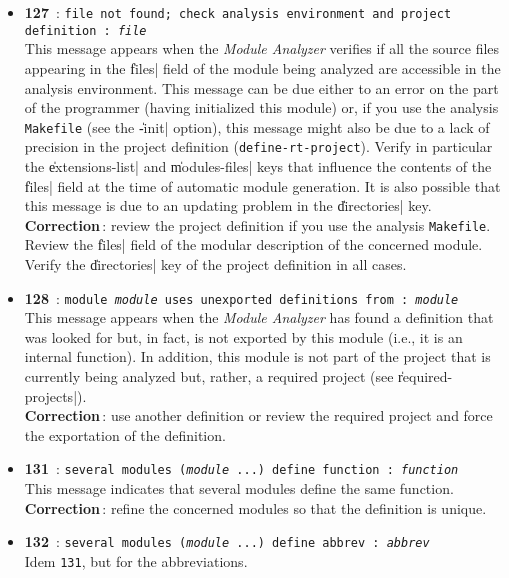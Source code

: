 \begin{itemize}
\item {\Large {\bf 127}}\ : {\tt file not found; check analysis environment
and project definition : {\em file}}\\
This message appears when the {\em Module Analyzer} verifies if all the source files appearing in the \|files| field of the module being analyzed are accessible in the analysis environment.  This message can be due either to an error on the part of the programmer (having initialized this module) or, if you use the analysis {\tt Makefile} (see the \|-init| option), this message might also be due to a lack of precision in the project definition ({\tt define-rt-project}).  Verify in particular the \|extensions-list| and \|modules-files| keys that influence the contents of the \|files| field at the time of automatic module generation.  It is also possible that this message is due to an updating problem in the \|directories| key.\\    
{\bf Correction}\,:  review the project definition if you use the analysis {\tt Makefile}.  Review the \|files| field of the modular description of the concerned module.  Verify the \|directories| key of the project definition in all cases. 
\item {\Large {\bf 128}}\ : {\tt module {\em module} uses unexported definitions
from : {\em module}}\\
This message appears when the {\em Module Analyzer} has found a definition that was looked for but, in fact, is not exported by this module (i.e., it is an internal function).  In addition, this module is not part of the project that is currently being analyzed but, rather, a required project (see \|required-projects|).\\
{\bf Correction}\,: use another definition or review the required project and force the exportation of the definition.

\item {\Large {\bf 131}}\ : {\tt several modules ({\em module} ...) define
function : {\em function}}\\
This message indicates that several modules define the same function.\\
{\bf Correction}\,: refine the concerned modules so that the definition is unique. 

\item {\Large {\bf 132}}\ : {\tt several modules ({\em module} ...) define
abbrev : {\em abbrev}}\\
Idem {\tt 131}, but for the abbreviations.


\end{itemize}
